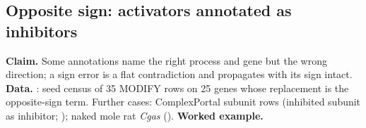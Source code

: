 \subsection{Opposite sign: activators annotated as inhibitors}\label{sec:dd-sign}
\textbf{Claim.} Some annotations name the right process and gene but the wrong direction; a sign
error is a flat contradiction and propagates with its sign intact.
\textbf{Data.} : seed census of 35 MODIFY rows on 25 genes whose replacement is
the opposite-sign term. Further cases: ComplexPortal subunit rows (inhibited subunit as inhibitor;
); naked mole rat \textit{Cgas} ().
\textbf{Worked example.} 
